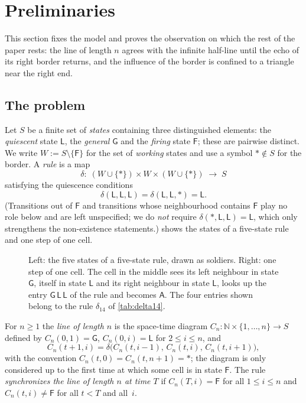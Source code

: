\section{Preliminaries}\label{sec:prelim}

This section fixes the model and proves the observation on which the rest
of the paper rests: the line of length $n$ agrees with the infinite
half-line until the echo of its right border returns, and the influence of
the border is confined to a triangle near the right end.

\subsection{The problem}

Let $S$ be a finite set of \emph{states} containing three distinguished
elements: the \emph{quiescent} state $\mathsf L$, the \emph{general}
$\mathsf G$ and the \emph{firing} state $\mathsf F$; these are pairwise
distinct. We write $W:=S\setminus\{\mathsf F\}$ for the set of
\emph{working} states and use a symbol $\ast\notin S$ for the border.
A \emph{rule} is a map
\[
\delta:\;(W\cup\{\ast\})\times W\times(W\cup\{\ast\})\;\longrightarrow\;S
\]
satisfying the quiescence conditions
\begin{equation}\label{eq:quiescence}
\delta(\mathsf L,\mathsf L,\mathsf L)=\delta(\mathsf L,\mathsf L,\ast)=\mathsf L .
\end{equation}
(Transitions out of $\mathsf F$ and transitions whose neighbourhood contains
$\mathsf F$ play no role below and are left unspecified; we do \emph{not}
require $\delta(\ast,\mathsf L,\mathsf L)=\mathsf L$, which only strengthens
the non-existence statements.)
 shows the states of a five-state rule and one step of one
cell.

\begin{figure}[t]
\centering

\caption{Left: the five states of a five-state rule, drawn as soldiers.
Right: one step of one cell. The cell in the middle sees its left neighbour
in state $\mathsf G$, itself in state $\mathsf L$ and its right neighbour in
state $\mathsf L$, looks up the entry $\mathsf G\,\mathsf L\,\mathsf L$ of
the rule and becomes $\mathsf A$. The four entries shown belong to the
rule $\delta_{14}$ of \cref{tab:delta14}.}
\label{fig:moods}
\end{figure}

For $n\ge 1$ the \emph{line of length $n$} is the space-time diagram
$C_n:\mathbb N\times\{1,\dots,n\}\to S$ defined by
$C_n(0,1)=\mathsf G$, $C_n(0,i)=\mathsf L$ for $2\le i\le n$, and
\[
C_n(t+1,i)=\delta\bigl(C_n(t,i-1),\,C_n(t,i),\,C_n(t,i+1)\bigr),
\]
with the convention $C_n(t,0)=C_n(t,n+1)=\ast$; the diagram is only
considered up to the first time at which some cell is in state $\mathsf F$.
The rule \emph{synchronizes the line of length $n$ at time $T$} if
$C_n(T,i)=\mathsf F$ for all $1\le i\le n$ and $C_n(t,i)\neq\mathsf F$ for all
$t<T$ and all~$i$.

